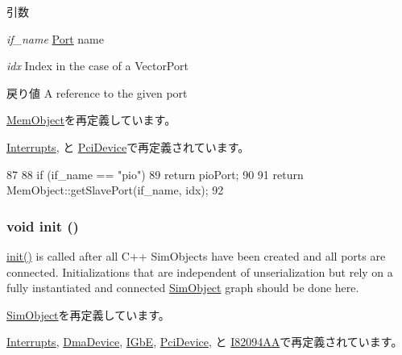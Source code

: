 \begin{DoxyParams}{引数}
\item[{\em if\_\-name}]\hyperlink{classPort}{Port} name \item[{\em idx}]Index in the case of a VectorPort\end{DoxyParams}
\begin{DoxyReturn}{戻り値}
A reference to the given port 
\end{DoxyReturn}


\hyperlink{classMemObject_ac918a145092d7514ebc6dbd952dceafb}{MemObject}を再定義しています。

\hyperlink{classX86ISA_1_1Interrupts_a5b5b45105eb4b64567ecea56e5bc30f2}{Interrupts}, と \hyperlink{classPciDevice_a4edba7d5e567b66fcd93297802a97077}{PciDevice}で再定義されています。


\begin{DoxyCode}
87 {
88     if (if_name == "pio") {
89         return pioPort;
90     }
91     return MemObject::getSlavePort(if_name, idx);
92 }
\end{DoxyCode}
\hypertarget{classPioDevice_a02fd73d861ef2e4aabb38c0c9ff82947}{
\subsubsection[{init}]{\setlength{\rightskip}{0pt plus 5cm}void init ()}}
\label{classPioDevice_a02fd73d861ef2e4aabb38c0c9ff82947}
\hyperlink{classPioDevice_a02fd73d861ef2e4aabb38c0c9ff82947}{init()} is called after all C++ SimObjects have been created and all ports are connected. Initializations that are independent of unserialization but rely on a fully instantiated and connected \hyperlink{classSimObject}{SimObject} graph should be done here. 

\hyperlink{classSimObject_a02fd73d861ef2e4aabb38c0c9ff82947}{SimObject}を再定義しています。

\hyperlink{classX86ISA_1_1Interrupts_a02fd73d861ef2e4aabb38c0c9ff82947}{Interrupts}, \hyperlink{classDmaDevice_a02fd73d861ef2e4aabb38c0c9ff82947}{DmaDevice}, \hyperlink{classIGbE_a02fd73d861ef2e4aabb38c0c9ff82947}{IGbE}, \hyperlink{classPciDevice_a02fd73d861ef2e4aabb38c0c9ff82947}{PciDevice}, と \hyperlink{classX86ISA_1_1I82094AA_a02fd73d861ef2e4aabb38c0c9ff82947}{I82094AA}で再定義されています。


